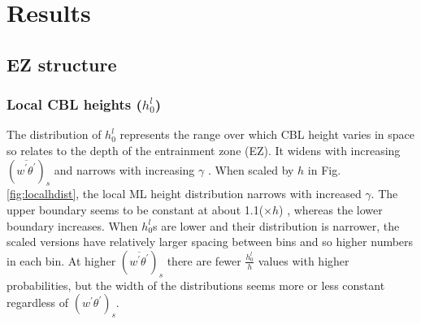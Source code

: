 \section{Results}
\subsection{EZ structure}

\subsubsection{Local CBL heights ($h_{0}^{l}$)}
\label{subsubsec:loccblh}

The distribution of $h_{0}^{l}$ represents the range over which CBL height varies in space so relates to the depth of the entrainment zone (EZ).  It widens with increasing $(\overline{w^{'}\theta^{'}})_{s}$ and narrows with increasing $\gamma$ \citep{NChap14}.  When scaled by $h$ in Fig. \ref{fig:localhdist}, the local ML height distribution narrows with increased $\gamma$.  The upper boundary seems to be constant at about 1.1($\times h$) , whereas the lower boundary increases.  When $h_{0}^{l}$s are lower and their distribution is narrower, the scaled versions have relatively larger spacing between bins and so higher numbers in each bin. At higher $(\overline{w^{'}\theta^{'}})_{s}$ there are fewer $\frac{h_{0}^{l}}{h}$ values with higher probabilities, but the width of the distributions seems more or less constant regardless of $(w^{'}\theta^{'})_{s}$.\\


